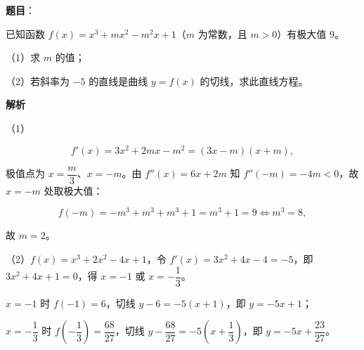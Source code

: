 \begin{answer}

\textbf{题目}：

已知函数 $f(x)=x^3+mx^2-m^2x+1$（$m$ 为常数，且 $m>0$）有极大值 $9$。

（1）求 $m$ 的值；

（2）若斜率为 $-5$ 的直线是曲线 $y=f(x)$ 的切线，求此直线方程。

\textbf{解析}

（1）

\nopagebreak[4]
\[f'(x)=3x^2+2mx-m^2=(3x-m)(x+m),\]

极值点为 $x=\dfrac m3$、$x=-m$。由 $f''(x)=6x+2m$ 知 $f''(-m)=-4m<0$，故 $x=-m$ 处取极大值：

\nopagebreak[4]
\[f(-m)=-m^3+m^3+m^3+1=m^3+1=9\iff m^3=8,\]

故 $m=2$。

（2）$f(x)=x^3+2x^2-4x+1$，令 $f'(x)=3x^2+4x-4=-5$，即 $3x^2+4x+1=0$，得 $x=-1$ 或 $x=-\dfrac13$。

$x=-1$ 时 $f(-1)=6$，切线 $y-6=-5(x+1)$，即 $y=-5x+1$；

$x=-\dfrac13$ 时 $f\left(-\dfrac13\right)=\dfrac{68}{27}$，切线 $y-\dfrac{68}{27}=-5\left(x+\dfrac13\right)$，即 $y=-5x+\dfrac{23}{27}$。


\end{answer}
